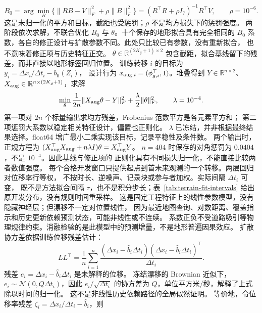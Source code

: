 \documentclass[UTF8,11pt]{ctexart}
\newcommand{\R}{\mathbb{R}}
\begin{document}
\begin{equation}
B_0=\arg\min_B\{\|RB-V\|_F^2+\rho\|B\|_F^2\}
 =(R^\top R+\rho I_7)^{-1}R^\top V,\qquad\rho=10^{-6}.
\label{eq:baseline-fit}
\end{equation}
这是未归一化的平方和目标，截距也受惩罚；\(\rho\) 不是均方损失下的惩罚强度。
两阶段依次求解，不联合优化 \(B_0\) 与 \(\theta\)。十个保存的地形拟合具有完全相同的
\(B_0\) 系数，各自的修正设计与扩散参数不同。此处只比较已有参数，没有重新拟合，
也不意味着修正项与历史特征正交。
\(\theta\in\R^{(2K_g+1)\times2}\) 包含截距，拟合基线留下的残差，而非直接以地形标签回归位置。
训练转移 \(i\) 的目标为 \(y_i=\Delta x_i/\Delta t_i-b_0(Z_i)\)，
设计行为 \(x_{{\rm aug},i}=(\phi_{g,i}^\top,1)\)。堆叠得到
\(Y\in\R^{n\times2}\)、\(X_{\rm aug}\in\R^{n\times(2K_g+1)}\)，求解
\begin{equation}
\min_\theta\frac{1}{2n}\|X_{\rm aug}\theta-Y\|_F^2
 +\frac{\lambda}{2}\|\theta\|_F^2,\qquad\lambda=10^{-4}.
\label{eq:conditioner-fit}
\end{equation}
第一项对 \(2n\) 个标量输出求均方残差，Frobenius 范数平方是各元素平方和；
第二项惩罚大系数以稳定相关特征设计，偏置也正则化。
\(\lambda\) 已冻结，并非根据最终结果选择。float64 增广最小二乘实现该目标，记录平稳性及条件数。
两个输出时，正规方程为
\((X_{\rm aug}^\top X_{\rm aug}+n\lambda I)\theta=X_{\rm aug}^\top Y\)。
\(n=404\) 时保存的对角惩罚为 \(0.0404\)，不是 \(10^{-4}\)。因此基线与修正项的
正则化具有不同损失归一化，不能直接比较两者数值强度。
每个合格开发窗口只提供起点到首未来观测的一个转移。两层回归对位移率行等权，
不按时长、逆噪声、记录块或参与者加权。实际间隔 \(\Delta t_i\) 可变，
既不是方法拟合间隔 \(\tau\)，也不是积分步长；表~\ref{tab:terrain-fit-intervals}
给出原开发分布，没有规则时间重采样。
这是固定工程特征上的线性参数模型，没有隐藏神经层；但漂移不一定对位置线性，
因为最近地图查询、对数距离、覆盖指示和历史更新依赖预测状态，可能非线性或不连续。
系数正负不受道路吸引等物理规律约束。消融检验的是此模型中的预测增量，不是地形普遍因果效应。
扩散协方差依据训练位移残差估计：
\begin{equation}
LL^\top=\frac1n\sum_{i=1}^{n}
\frac{(\Delta x_i-\widehat b_i\Delta t_i)(\Delta x_i-\widehat b_i\Delta t_i)^\top}{\Delta t_i}.
\label{eq:diffusion}
\end{equation}
残差 \(e_i=\Delta x_i-\widehat b_i\Delta t_i\) 是未解释的位移。
冻结漂移的 Brownian 近似下，\(e_i\sim\mathcal N(0,Q\Delta t_i)\)，因此
\(e_i/\sqrt{\Delta t_i}\) 的协方差为 \(Q\)，单位平方米/秒，解释了上式除以时间的归一化。
这不是非线性历史依赖路径的全局似然证明。
等价地，令位移率残差 \(\zeta_i=\Delta x_i/\Delta t_i-\widehat b_i\)，则
\end{document}
